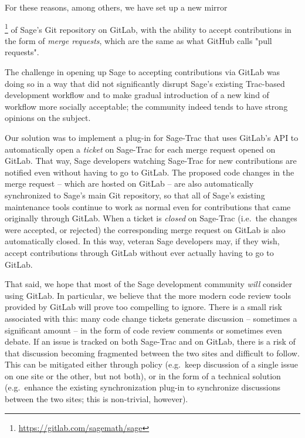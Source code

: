For these reasons, among others, we have set up a new
mirror{\footnote{\url{https://gitlab.com/sagemath/sage}} of Sage's Git
repository on GitLab, with the ability to accept contributions in the form of
{\em merge requests}, which are the same as what GitHub calls "pull requests".

The challenge in opening up Sage to accepting contributions via GitLab was
doing so in a way that did not significantly disrupt Sage's existing Trac-based
development workflow and to make gradual introduction of a new kind of workflow
more socially acceptable; the community indeed tends to have strong opinions on
the subject.

Our solution was to implement a plug-in for Sage-Trac that uses GitLab's API to
automatically open a {\em ticket} on Sage-Trac for each merge request opened on
GitLab.  That way, Sage developers watching Sage-Trac for new contributions are
notified even without having to go to GitLab.  The proposed code changes in the
merge request -- which are hosted on GitLab -- are also automatically synchronized
to Sage's main Git repository, so that all of Sage's existing maintenance tools
continue to work as normal even for contributions that came originally through
GitLab.  When a ticket is {\em closed} on Sage-Trac (i.e.~the changes were
accepted, or rejected) the corresponding merge request on GitLab is also
automatically closed.  In this way, veteran Sage developers may, if they wish,
accept contributions through GitLab without ever actually having to go to
GitLab.

That said, we hope that most of the Sage development community {\em will}
consider using GitLab.  In particular, we believe that the more modern code
review tools provided by GitLab will prove too compelling to ignore.  There
is a small risk associated with this: many code change tickets generate
discussion -- sometimes a significant amount -- in the form of code review comments
or sometimes even debate.  If an issue is tracked on both Sage-Trac and on
GitLab, there is a risk of that discussion becoming fragmented between the two
sites and difficult to follow.  This can be mitigated either through policy
(e.g.~keep discussion of a single issue on one site or the other, but not
both), or in the form of a technical solution (e.g.~enhance the existing
synchronization plug-in to synchronize discussions between the two sites; this
is non-trivial, however).

}

